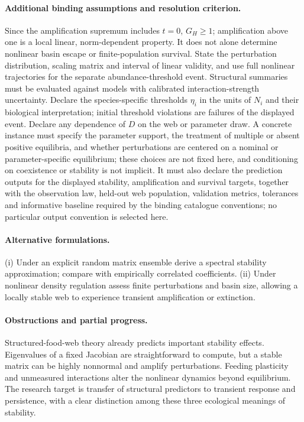 \documentclass[11pt]{article}
\begin{document}
\paragraph{Additional binding assumptions and resolution criterion.} Since the amplification supremum includes $t=0$, $G_H\geq1$; amplification above one is a local linear, norm-dependent property. It does not alone determine nonlinear basin escape or finite-population survival. State the perturbation distribution, scaling matrix and interval of linear validity, and use full nonlinear trajectories for the separate abundance-threshold event. Structural summaries must be evaluated against models with calibrated interaction-strength uncertainty. Declare the species-specific thresholds $\eta_i$ in the units of $N_i$ and their biological interpretation; initial threshold violations are failures of the displayed event. Declare any dependence of $D$ on the web or parameter draw. A concrete instance must specify the parameter support, the treatment of multiple or absent positive equilibria, and whether perturbations are centered on a nominal or parameter-specific equilibrium; these choices are not fixed here, and conditioning on coexistence or stability is not implicit. It must also declare the prediction outputs for the displayed stability, amplification and survival targets, together with the observation law, held-out web population, validation metrics, tolerances and informative baseline required by the binding catalogue conventions; no particular output convention is selected here.

\paragraph{Alternative formulations.} (i) Under an explicit random matrix ensemble derive a spectral stability approximation; compare with empirically correlated coefficients. (ii) Under nonlinear density regulation assess finite perturbations and basin size, allowing a locally stable web to experience transient amplification or extinction.
\paragraph{Obstructions and partial progress.} Structured-food-web theory already predicts important stability effects. Eigenvalues of a fixed Jacobian are straightforward to compute, but a stable matrix can be highly nonnormal and amplify perturbations. Feeding plasticity and unmeasured interactions alter the nonlinear dynamics beyond equilibrium. The research target is transfer of structural predictors to transient response and persistence, with a clear distinction among these three ecological meanings of stability.
\end{document}
